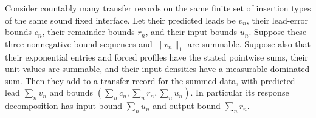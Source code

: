 \begin{lemma}
\label{lem:selected-coupon-merger}
Consider countably many transfer records on the same finite set of insertion types of the same
sound fixed interface. Let their predicted leads be $v_n$, their lead-error
bounds $c_n$, their remainder bounds $r_n$, and their input bounds
$u_n$. Suppose these three nonnegative bound sequences and
$\|v_n\|_1$ are summable. Suppose also that their exponential entries
and forced profiles have the stated pointwise sums, their unit values
are summable, and their input densities have a measurable dominated
sum. Then they add to a transfer record for the summed data, with predicted
lead $\sum_n v_n$ and bounds
$(\sum_n c_n,\sum_n r_n,\sum_n u_n)$. In particular its response decomposition has
input bound $\sum_n u_n$ and output bound $\sum_n r_n$.
\end{lemma}

